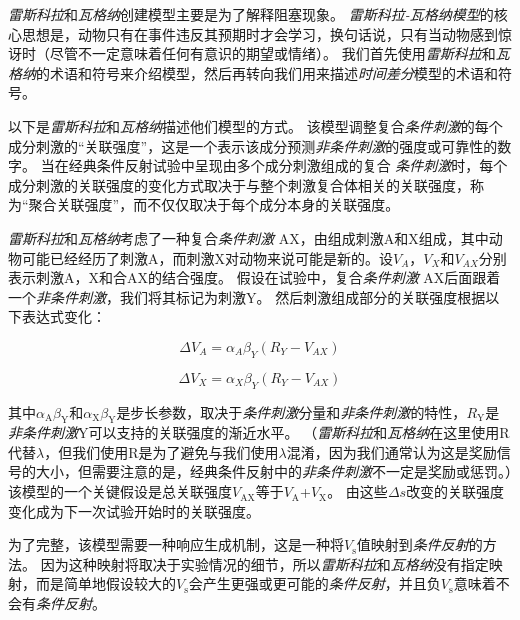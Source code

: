 \textit{雷斯科拉}和\textit{瓦格纳}创建模型主要是为了解释阻塞现象。
\textit{雷斯科拉-瓦格纳模型}的核心思想是，动物只有在事件违反其预期时才会学习，换句话说，只有当动物感到惊讶时（尽管不一定意味着任何有意识的期望或情绪）。
我们首先使用\textit{雷斯科拉}和\textit{瓦格纳}的术语和符号来介绍模型，然后再转向我们用来描述\textit{时间差分}模型的术语和符号。


以下是\textit{雷斯科拉}和\textit{瓦格纳}描述他们模型的方式。
该模型调整复合\textit{条件刺激}的每个成分刺激的“关联强度”，这是一个表示该成分预测\textit{非条件刺激}的强度或可靠性的数字。
当在经典条件反射试验中呈现由多个成分刺激组成的复合 \textit{条件刺激}时，每个成分刺激的关联强度的变化方式取决于与整个刺激复合体相关的关联强度，称为“聚合关联强度”，而不仅仅取决于每个成分本身的关联强度。


\textit{雷斯科拉}和\textit{瓦格纳}考虑了一种复合\textit{条件刺激} AX，由组成刺激A和X组成，其中动物可能已经经历了刺激A，而刺激X对动物来说可能是新的。设$V_A$，$V_X$和$V_{AX}$分别表示刺激A，X和合AX的结合强度。
假设在试验中，复合\textit{条件刺激} AX后面跟着一个\textit{非条件刺激}，我们将其标记为刺激Y。
然后刺激组成部分的关联强度根据以下表达式变化：

\begin{equation}
	\Delta V_A = \alpha_A \beta_Y
	(R_Y - V_{AX})
\end{equation}


\begin{equation}
	\Delta V_X = 
	\alpha_X \beta_Y
	(R_Y - V_{AX})
\end{equation}

其中$\alpha_{\mathrm{A}} \beta_{\mathrm{Y}}$和$\alpha_{\mathrm{X}} \beta_{\mathrm{Y}}$是步长参数，取决于\textit{条件刺激}分量和\textit{非条件刺激}的特性，$R_{\mathrm{Y}}$是\textit{非条件刺激}Y可以支持的关联强度的渐近水平。
（\textit{雷斯科拉}和\textit{瓦格纳}在这里使用R代替$\lambda$，但我们使用R是为了避免与我们使用$\lambda$混淆，因为我们通常认为这是奖励信号的大小，但需要注意的是，经典条件反射中的\textit{非条件刺激}不一定是奖励或惩罚。）该模型的一个关键假设是总关联强度$V_{\mathrm{AX}}$等于$V_{\mathrm{A}}$+$V_{\mathrm{X}}$。
由这些$\Delta s$改变的关联强度变化成为下一次试验开始时的关联强度。


为了完整，该模型需要一种响应生成机制，这是一种将$V_{\mathrm{s}}$值映射到\textit{条件反射}的方法。
因为这种映射将取决于实验情况的细节，所以\textit{雷斯科拉}和\textit{瓦格纳}没有指定映射，而是简单地假设较大的$V_{\mathrm{s}}$会产生更强或更可能的\textit{条件反射}，并且负$V_{\mathrm{s}}$意味着不会有\textit{条件反射}。



